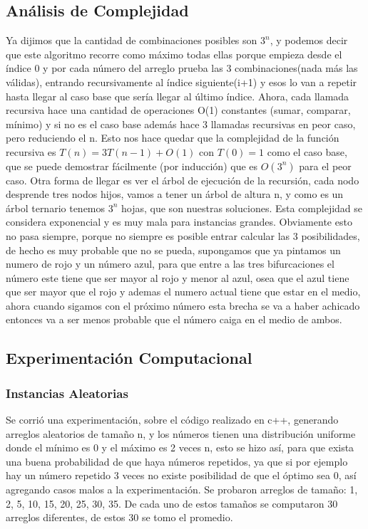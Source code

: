 \subsection*{Análisis de Complejidad}
Ya dijimos que la cantidad de combinaciones posibles son $3^n$, y podemos decir que este algoritmo recorre como máximo todas ellas porque empieza desde el índice 0 y por cada número del arreglo prueba las 3 combinaciones(nada más las válidas), entrando recursivamente al índice siguiente(i+1) y esos lo van a repetir hasta llegar al caso base que sería llegar al último índice. Ahora, cada llamada recursiva hace una cantidad de operaciones O(1) constantes (sumar, comparar, mínimo) y si no es el caso base además hace 3 llamadas recursivas en peor caso, pero reduciendo el n. Esto nos hace quedar que la complejidad de la función recursiva es $T(n) = 3T(n-1) + O(1)$ con $T(0) = 1$ como el caso base, que se puede demostrar fácilmente (por inducción) que es $O(3^n)$ para el peor caso. Otra forma de llegar es ver el árbol de ejecución de la recursión, cada nodo desprende tres nodos hijos, vamos a tener un árbol de altura n, y como es un árbol ternario tenemos $3^n$ hojas, que son nuestras soluciones. Esta complejidad se considera exponencial y es muy mala para instancias grandes.
Obviamente esto no pasa siempre, porque no siempre es posible entrar calcular las 3 posibilidades, de hecho es muy probable que no se pueda, supongamos que ya pintamos un numero de rojo y un número azul, para que entre a las tres bifurcaciones el número este tiene que ser mayor al rojo y menor al azul, osea que el azul tiene que ser mayor que el rojo y ademas el numero actual tiene que estar en el medio, ahora cuando sigamos con el próximo número esta brecha se va a haber achicado entonces va a ser menos probable que el número caiga en el medio de ambos.

\subsection*{Experimentación Computacional}
\subsubsection*{Instancias Aleatorias}
Se corrió una experimentación, sobre el código realizado en c++, generando arreglos aleatorios de tamaño n, y los números tienen una distribución uniforme donde el mínimo es 0 y el máximo es 2 veces n, esto se hizo así, para que exista una buena probabilidad de que haya números repetidos, ya que si por ejemplo hay un número repetido 3 veces no existe posibilidad de que el óptimo sea 0, así agregando casos malos a la experimentación. Se probaron arreglos de tamaño: 1, 2, 5, 10, 15, 20, 25, 30, 35. De cada uno de estos tamaños se computaron 30 arreglos diferentes, de estos 30 se tomo el promedio.


